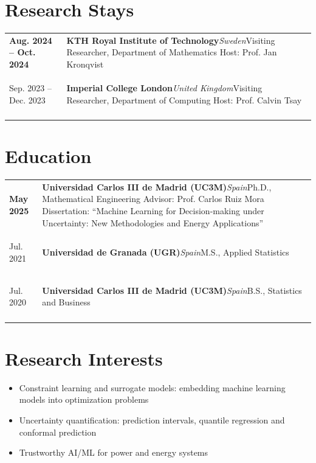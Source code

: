 \documentclass[10pt,a4paper]{article}
\makeatletter
\newenvironment{cvtable}
  {\begin{longtable}{@{} >{\raggedright\arraybackslash\bfseries}p{0.135\textwidth}
                        !{\color{rulegray}\vrule width 0.9pt}
                        >{\raggedright\arraybackslash}p{0.83\textwidth} @{}}}
  {\end{longtable}}
\newcommand{\cventry}[4]{%
  #1 & \textbf{#2}\hfill\textit{\color{mutedtext}#3}\newline #4
  \tabularnewline \noalign{\vskip 5pt}%
}
\makeatother
\begin{document}
\section*{Research Stays}
\begin{cvtable}
    \cventry{Aug. 2024 -- Oct. 2024}
    {KTH Royal Institute of Technology}
    {Sweden}
    {Visiting Researcher, Department of Mathematics\newline
    Host: Prof. Jan Kronqvist}

    \cventry{Sep. 2023 -- Dec. 2023}
    {Imperial College London}
    {United Kingdom}
    {Visiting Researcher, Department of Computing\newline
    Host: Prof. Calvin Tsay}
\end{cvtable}

\section*{Education}
\begin{cvtable}
    \cventry{May 2025}
    {Universidad Carlos III de Madrid (UC3M)}
    {Spain}
    {Ph.D., Mathematical Engineering\newline
    Advisor: Prof. Carlos Ruiz Mora\newline
    Dissertation: ``Machine Learning for Decision-making under Uncertainty:
    New Methodologies and Energy Applications''}

    \cventry{Jul. 2021}
    {Universidad de Granada (UGR)}
    {Spain}
    {M.S., Applied Statistics}

    \cventry{Jul. 2020}
    {Universidad Carlos III de Madrid (UC3M)}
    {Spain}
    {B.S., Statistics and Business}
\end{cvtable}

\section*{Research Interests}
\begin{itemize}[leftmargin=1.2em,itemsep=1.5pt,topsep=2pt,parsep=0pt]
    \item Constraint learning and surrogate models: embedding machine learning
          models into optimization problems
    \item Uncertainty quantification: prediction intervals, quantile regression
          and conformal prediction
    \item Trustworthy AI/ML for power and energy systems
\end{itemize}
\newpage
\end{document}
